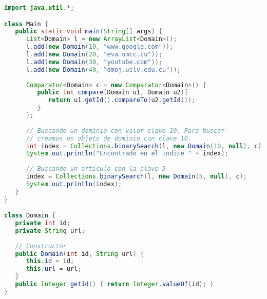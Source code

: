 \begin{enumerate}
\begin{lstlisting}[language=Java]
import java.util.*;

class Main {
   public static void main(String[] args) {
      List<Domain> l = new ArrayList<Domain>();
      l.add(new Domain(10, "www.google.com"));
      l.add(new Domain(20, "eva.umcc.cu"));
      l.add(new Domain(30, "youtube.com"));
      l.add(new Domain(40, "dmoj.uclv.edu.cu"));
      
      Comparator<Domain> c = new Comparator<Domain>() {
         public int compare(Domain u1, Domain u2){
            return u1.getId().compareTo(u2.getId());
         }
      };
		
      // Buscando un dominio con valor clave 10. Para buscar
      // creamos un objeto de dominio con clave 10.
      int index = Collections.binarySearch(l, new Domain(10, null), c);
      System.out.println("Encontrado en el indice " + index);
		
      // Buscando un articulo con la clave 5
      index = Collections.binarySearch(l, new Domain(5, null), c);
      System.out.println(index);
   }
}

class Domain {
   private int id;
   private String url;
	
   // Constructor
   public Domain(int id, String url) {
      this.id = id;
      this.url = url;
   }
   public Integer getId() { return Integer.valueOf(id); }
}
\end{lstlisting}
	
\end{enumerate}
